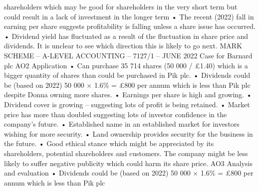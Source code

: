 \documentclass{article}
\begin{document}
shareholders which may be good for shareholders in the very short term but could result in a lack of \newline
investment in the longer term   \newline
• The recent (2022) fall in earning per share suggests profitability is falling unless a share issue has \newline
occurred.   \newline
• Dividend yield has fluctuated as a result of the fluctuation in share price and dividends.  It is unclear to \newline
see which direction this is likely to go next. \newline
MARK SCHEME – A-LEVEL ACCOUNTING – 7127/1 – JUNE 2022  \newline
Case for Barnard plc \newline
 \newline
AO2 Application \newline
• Can purchase 35 714 shares (50 000 / £1.40) which is a bigger quantity of shares than could be \newline
purchased in Pik plc. \newline
• Dividends could be (based on 2022) 50 000 × 1.6\% = £800 per annum which is less than Pik plc \newline
despite Donna owning more shares. \newline
• Earnings per share is high and growing. \newline
• Dividend cover is growing – suggesting lots of profit is being retained. \newline
• Market price has more than doubled suggesting lots of investor confidence in the company’s future. \newline
• Established name in an established market for investors wishing for more security. \newline
• Land ownership provides security for the business in the future. \newline
• Good ethical stance which might be appreciated by its shareholders, potential shareholders and \newline
customers.  The company might be less likely to suffer negative publicity which could harm its share \newline
price. \newline
 \newline
AO3 Analysis and evaluation \newline
• Dividends could be (based on 2022) 50 000 × 1.6\% = £800 per annum which is less than Pik plc \newline
\end{document}
